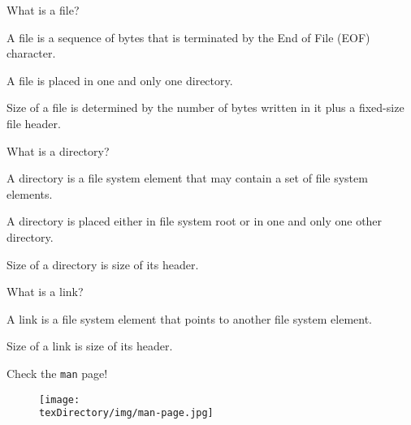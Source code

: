 \documentclass[compress]{beamer}
\begin{document}
\begin{slide}
	\begin{block}{What is a file?}

	A file is a sequence of bytes that is terminated by the End of File (EOF) character.

	A file is placed in one and only one directory.

	Size of a file is determined by the number of bytes written in it plus a fixed-size file header.

	\end{block}
\end{slide}

\begin{slide}
	\begin{block}{What is a directory?}

	A directory is a file system element that may contain a set of file system elements.

	A directory is placed either in file system root or in one and only one other directory.

	Size of a directory is size of its header.

	\end{block}
\end{slide}

\begin{slide}
	\begin{block}{What is a link?}

	A link is a file system element that points to another file system element.

	Size of a link is size of its header.

	\end{block}
\end{slide}

\begin{slide}
	\begin{block}{Check the \texttt{man} page!}

	\begin{figure}
	\texttt{[image: \\texDirectory/img/man-page.jpg]}
	\end{figure}

	\end{block}
\end{slide}
\end{document}
